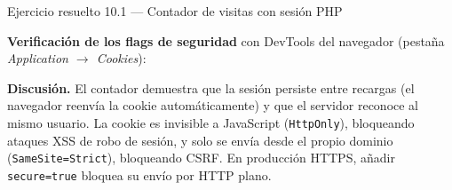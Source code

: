 \documentclass[11pt,a4paper,openany]{book}
\begin{document}
\begin{cajaejemplo}{Ejercicio resuelto 10.1 --- Contador de visitas con sesión PHP}
\begin{center}
\end{center}

\textbf{Verificación de los flags de seguridad} con DevTools del
navegador (pestaña \emph{Application $\to$ Cookies}):

\begin{center}
\end{center}

\textbf{Discusión.} El contador demuestra que la sesión persiste
entre recargas (el navegador reenvía la cookie automáticamente) y
que el servidor reconoce al mismo usuario. La cookie es invisible a
JavaScript (\texttt{HttpOnly}), bloqueando ataques XSS de robo de
sesión, y solo se envía desde el propio dominio
(\texttt{SameSite=Strict}), bloqueando CSRF. En producción HTTPS,
añadir \texttt{secure=true} bloquea su envío por HTTP plano.
\end{cajaejemplo}
\end{document}
